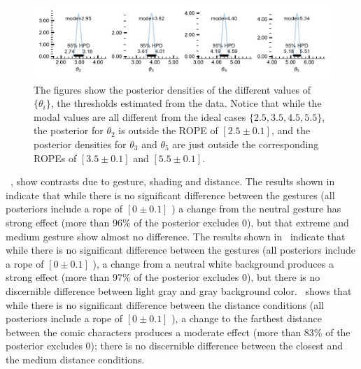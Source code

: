 \begin{figure}
 \includegraphics[width=\textwidth]{./hari-code/factors_theta_values_main-noint.pdf}
 \caption{The figures show the posterior densities of the different values of $\{\theta_i\}$, the thresholds estimated from the data. Notice that while the modal values are all different from the ideal cases $\{2.5, 3.5, 4.5, 5.5\}$, the posterior for $\theta_2$ is outside the ROPE of $[2.5\pm 0.1]$, and the posterior densities for $\theta_3$ and $\theta_5$ are just outside the corresponding ROPEs of $[3.5 \pm 0.1]$ and $[5.5 \pm 0.1]$.}
 \label{fig:theta-main}
\end{figure}

~, show contrasts due to gesture, shading and distance. The results shown in~ indicate that while there is no significant difference between the gestures (all posteriors include a rope of $[0 \pm 0.1]$ ) a change from the neutral gesture has strong effect (more than 96\% of the posterior excludes 0), but that extreme and medium gesture show almost no difference. The results shown in~ indicate that while there  is no significant difference between the gestures (all posteriors include a rope of $[0 \pm 0.1]$ ), a change from a neutral white background produces a strong effect (more than 97\% of the posterior excludes 0), but there is no discernible difference between light gray and gray background color.~ shows that while there  is no significant difference between the distance conditions (all posteriors include a rope of $[0 \pm 0.1]$ ), a change to the farthest distance between the comic characters produces a moderate effect (more than 83\% of the posterior excludes 0); there is no discernible difference between the closest and the medium distance conditions.

